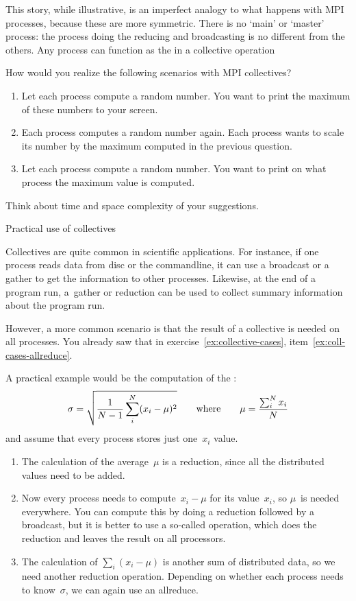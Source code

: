 This story, while illustrative, is an imperfect analogy to
what happens with MPI processes, because these are more symmetric.
There is no `main' or `master' process: the process doing the
reducing and broadcasting is no different from the others.
Any process can function as the  in a
collective operation

\begin{exercise}
  \label{ex:collective-cases}
  How would you realize the following scenarios with MPI collectives?
  \begin{enumerate}
  \item Let each process compute a random number. You want to print the
    maximum of these numbers to your screen.
  \item\label{ex:coll-cases-allreduce}
    Each process computes a random number again.
    Each process wants to scale its number by the maximum computed
    in the previous question.
  \item Let each process compute a random number. You want to print on what process the
    maximum value is computed. 
  \end{enumerate}
  Think about time and space complexity of your suggestions.
\end{exercise}

 {Practical use of collectives}

Collectives are quite common in scientific applications. For instance,
if one process reads data from disc or the commandline, it can use a
broadcast or a gather to get the information to other
processes. Likewise, at the end of a program run, a~gather or
reduction can be used to collect summary information about the program
run.

However, a more common scenario is 
that the result of a collective is needed on all processes.
You already saw that in exercise~\ref{ex:collective-cases},
item~\ref{ex:coll-cases-allreduce}.

A practical example would be the computation of the :
\[ \sigma = \sqrt{\frac1{N-1} \sum_i^N (x_i-\mu)^2 }
\qquad\hbox{where}\qquad \mu = \frac{\sum_i^Nx_i}N
\]
and assume that every process stores just one~$x_i$ value.
\begin{enumerate}
\item The calculation of the average~$\mu$ is a reduction, since all
  the distributed values need to be added.
\item Now every
  process needs to compute~$x_i-\mu$ for its value~$x_i$, so $\mu$~is
  needed everywhere. You can compute this by doing a reduction followed
  by a broadcast, but it is better to use a so-called
   operation, which does the reduction and leaves
  the result on all processors.
\item The calculation of $\sum_i(x_i-\mu)$ is another sum of
  distributed data, so we need another reduction operation. Depending
  on whether each process needs to know~$\sigma$, we can again use an
  allreduce.
\end{enumerate}

